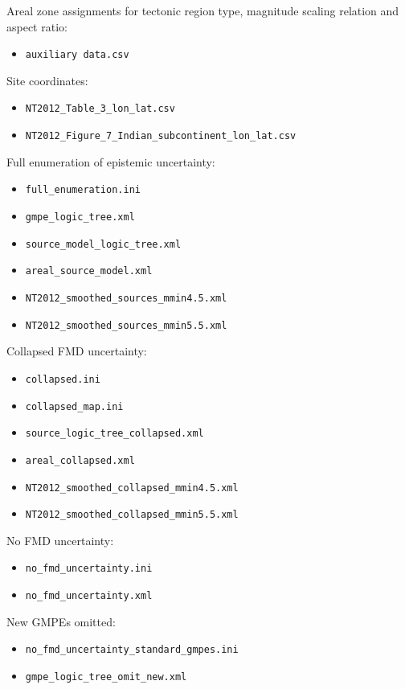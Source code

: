 \documentclass{article}
\begin{document}
\begin{appendices}
Areal zone assignments for tectonic region type, magnitude scaling relation and aspect ratio:
\begin{itemize}
\item \texttt{auxiliary data.csv} 
\end{itemize}

Site coordinates:
\begin{itemize}
\item \texttt{NT2012\_Table\_3\_lon\_lat.csv}
\item \texttt{NT2012\_Figure\_7\_Indian\_subcontinent\_lon\_lat.csv}
\end{itemize}

Full enumeration of epistemic uncertainty:
\begin{itemize}
\item \texttt{full\_enumeration.ini} 
\item \texttt{gmpe\_logic\_tree.xml} 
\item \texttt{source\_model\_logic\_tree.xml}
\item \texttt{areal\_source\_model.xml} 
\item \texttt{NT2012\_smoothed\_sources\_mmin4.5.xml} 
\item \texttt{NT2012\_smoothed\_sources\_mmin5.5.xml} 
\end{itemize}

Collapsed FMD uncertainty:
\begin{itemize}
\item \texttt{collapsed.ini} 
\item \texttt{collapsed\_map.ini} 
\item \texttt{source\_logic\_tree\_collapsed.xml} 
\item \texttt{areal\_collapsed.xml} 
\item \texttt{NT2012\_smoothed\_collapsed\_mmin4.5.xml} 
\item \texttt{NT2012\_smoothed\_collapsed\_mmin5.5.xml} 
\end{itemize}

No FMD uncertainty:
\begin{itemize}
\item \texttt{no\_fmd\_uncertainty.ini} 
\item \texttt{no\_fmd\_uncertainty.xml} 
\end{itemize}

New GMPEs omitted:
\begin{itemize}
\item \texttt{no\_fmd\_uncertainty\_standard\_gmpes.ini} 
\item \texttt{gmpe\_logic\_tree\_omit\_new.xml} 
\end{itemize}

\end{appendices}
\end{document}
